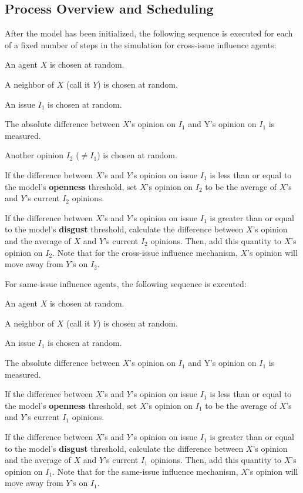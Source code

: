 \subsection{Process Overview and Scheduling}
\label{modelProcess}

After the model has been initialized, the following sequence is executed for
each of a fixed number of steps in the simulation for cross-issue influence agents:

\begin{compactenum}
\item An agent $X$ is chosen at random.  
\item A neighbor of $X$ (call it $Y$) is chosen at random.
\item An issue $I_1$ is chosen at random.
\item The absolute difference between $X$'s opinion on $I_1$ and Y's opinion on
$I_1$ is measured.
\item Another opinion $I_2$ ($\neq I_1$) is chosen at random.
\item If the difference between $X$'s and $Y$'s opinion on issue $I_1$ is less
than or equal to the model's \textbf{openness} threshold, set $X$'s opinion on
$I_2$ to be the average of $X$'s and $Y$'s current $I_2$ opinions.
\item If the difference between $X$'s and $Y$'s opinion on issue $I_1$ is greater
than or equal to the model's \textbf{disgust} threshold, calculate the difference between $X$'s opinion and the average of $X$ and $Y$'s current $I_2$ opinions. Then, add this quantity to $X$'s opinion on $I_2$. Note that for the cross-issue influence mechanism, $X$'s opinion will move away from $Y$'s on $I_2$. \\ 
\end{compactenum} 

For same-issue influence agents, the following sequence is executed:
\begin{compactenum}
\item An agent $X$ is chosen at random.  
\item A neighbor of $X$ (call it $Y$) is chosen at random.
\item An issue $I_1$ is chosen at random.
\item The absolute difference between $X$'s opinion on $I_1$ and Y's opinion on
$I_1$ is measured.
\item If the difference between $X$'s and $Y$'s opinion on issue $I_1$ is less
than or equal to the model's \textbf{openness} threshold, set $X$'s opinion on
$I_1$ to be the average of $X$'s and $Y$'s current $I_1$ opinions.
\item If the difference between $X$'s and $Y$'s opinion on issue $I_1$ is greater
than or equal to the model's \textbf{disgust} threshold, calculate the difference between $X$'s opinion and the average of $X$ and $Y$'s current $I_1$ opinions. Then, add this quantity to $X$'s opinion on $I_1$. Note that for the same-issue influence mechanism, $X$'s opinion will move away from $Y$'s on $I_1$. 
\end{compactenum}

